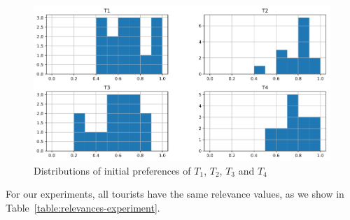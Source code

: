 \begin{figure}[h]
    \centering
    \includegraphics[scale=0.25]{tourist_histogram.png}
    \caption{Distributions of initial preferences of $T_1$, $T_2$, $T_3$ and $T_4$}
    \label{fig:tourist_hist} 
\end{figure}

For our experiments, all tourists have the same relevance values, as we show in 
Table~\ref{table:relevances-experiment}.


